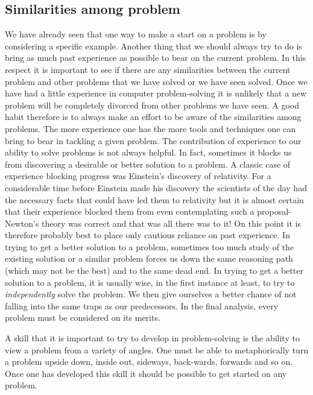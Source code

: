 \documentclass{book}
\begin{document}
\subsection{Similarities among problem}
We have already seen that one way to make a start on a problem is by considering a specific example. Another thing that we should always try to do is bring as much past experience as possible to bear on the current problem. In this respect it is important to see if there are any similarities between the current problem and other problems that we have solved or we have seen solved. Once we have had a little experience in computer problem-solving it is unlikely that a new problem will be completely divorced from other problems we have seen. A good habit therefore is to always make an effort to be aware of the similarities among problems. The more experience one has the more tools and techniques one can bring to bear in tackling a given problem. The contribution of experience to our ability to solve problems is not always helpful. In fact, sometimes it blocks us from discovering a desirable or better solution to a problem. A classic case of experience blocking progress was Einstein's discovery of relativity. For a considerable time before Einstein made his discovery the scientists of the day had the necessary facts that could have led them to relativity but it is almost certain that their experience blocked them from even contemplating such a proposal-Newton's theory was correct and that was all there was to it! On this point it is therefore probably best to place only cautious reliance on past experience. In trying to get a better solution to a problem, sometimes too much study of the existing solution or a similar problem forces us down the same reasoning path (which may not be the best) and to the same dead end. In trying to get a better solution to a problem, it is usually wise, in the first instance at least, to try to \textit{independently} solve the problem. We then give ourselves a better chance of not falling into the same traps as our predecessors. In the final analysis, every problem must be considered on its merits.\par
	A skill that it is important to try to develop in problem-solving is the ability to view a problem from a variety of angles. One must be able to metaphorically turn a problem upside down, inside out, sideways, back-wards, forwards and so on. Once one has developed this skill it should be possible to get started on any problem.
\end{document}
